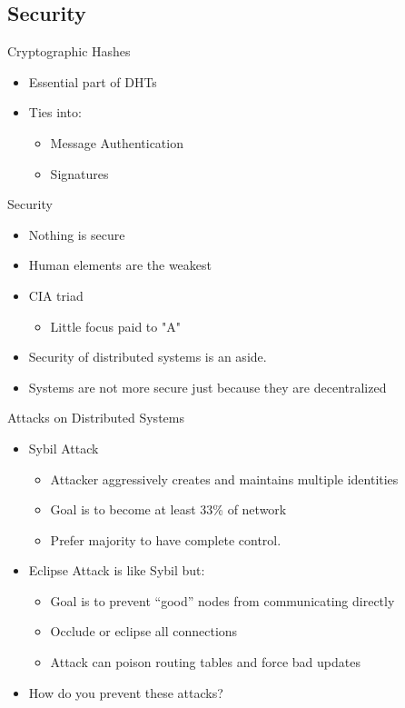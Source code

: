 \documentclass[11pt]{beamer}
\begin{document}
\subsection{Security}


\begin{frame}{Cryptographic Hashes}
	\begin{itemize}
		
	\item Essential part of DHTs
	\item Ties into:
	\begin{itemize}
		\item Message Authentication
		\item Signatures
	\end{itemize}
	\end{itemize}
	
\end{frame}


\begin{frame}{Security}
	\begin{itemize}
		\item Nothing is secure
		\item Human elements are the weakest
		\item CIA triad
		\begin{itemize}
			\item Little focus paid to "A"
			
		\end{itemize}
		\item Security of distributed systems is an aside.
		\item Systems are not more secure just because they are decentralized
		
	\end{itemize}
	
\end{frame}


\begin{frame}{Attacks on Distributed Systems}
	\begin{itemize}
		\item Sybil Attack
		\begin{itemize}
			\item Attacker aggressively creates and maintains multiple identities
			\item Goal is to become at least 33\% of network
			\item Prefer majority to have complete control.
		\end{itemize}
		\item Eclipse Attack is like Sybil but:
		\begin{itemize}
			\item Goal is to prevent ``good'' nodes from communicating directly
			\item Occlude or eclipse all connections
			\item Attack can poison routing tables and force bad updates
		\end{itemize}
		\item How do you prevent these attacks?
		
	\end{itemize}
	
\end{frame}
\end{document}
